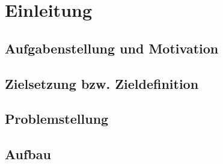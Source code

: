 \chapter{Einleitung}

\section{Aufgabenstellung und Motivation}

\section{Zielsetzung bzw. Zieldefinition}

\section{Problemstellung}

\section{Aufbau}